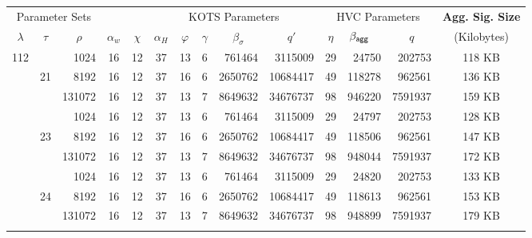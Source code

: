 \bgroup
\setlength{\tabcolsep}{0.5em}
\renewcommand{\arraystretch}{1.05}
\begin{table}\centering
    \begin{tabular}{ccr|cc|cccrr|crr|c}%
  
      \multicolumn{3}{c|}{Parameter Sets}
      & \multicolumn{2}{c|}{}
      & \multicolumn{5}{c|}{KOTS Parameters}  
      & \multicolumn{3}{c|}{HVC Parameters}  
      &  {\bf Agg. Sig. Size}\\%
      
      $\lambda$      & $\tau$
      & \multicolumn{1}{c|}{$\rho$}& $\alpha_w$ & $\chi$  &$\alpha_H$& $\varphi$ 
      & $\gamma$                      & \multicolumn{1}{c}{$\beta_\sigma$}     
      & \multicolumn{1}{c|}{$q'$}                     & $\eta$       
      & $\beta_{\mathsf{agg}}\quad$                  & \multicolumn{1}{c|}{$q$} 
      & (Kilobytes) \\\toprule
  
  

      \multirow{ 12}{*}{112}    
          &       &   1024   &        16 &    12 &        37 &    13 &       6 &       761464 &  3115009 &    29 &      24750 &  202753 & 118 KB \\
          &    21 &   8192   &        16 &    12 &        37 &    16 &       6 &      2650762 & 10684417 &    49 &     118278 &  962561 & 136 KB \\
          &       & 131072   &        16 &    12 &        37 &    13 &       7 &      8649632 & 34676737 &    98 &     946220 & 7591937 & 159 KB \\\cline{2-14}


          &       &   1024   &        16 &    12 &        37 &    13 &       6 &       761464 &  3115009 &    29 &      24797 &  202753 & 128 KB \\
          &    23 &   8192   &        16 &    12 &        37 &    16 &       6 &      2650762 & 10684417 &    49 &     118506 &  962561 & 147 KB \\
          &       & 131072   &        16 &    12 &        37 &    13 &       7 &      8649632 & 34676737 &    98 &     948044 & 7591937 & 172 KB \\\cline{2-14}
  
          &       &   1024   &        16 &    12 &        37 &    13 &       6 &       761464 &  3115009 &    29 &      24820 &  202753 & 133 KB \\
          &    24 &   8192   &        16 &    12 &        37 &    16 &       6 &      2650762 & 10684417 &    49 &     118613 &  962561 & 153 KB \\
          &       & 131072   &        16 &    12 &        37 &    13 &       7 &      8649632 & 34676737 &    98 &     948899 & 7591937 & 179 KB \\\cline{2-14}
      

\end{tabular}
\end{table}
